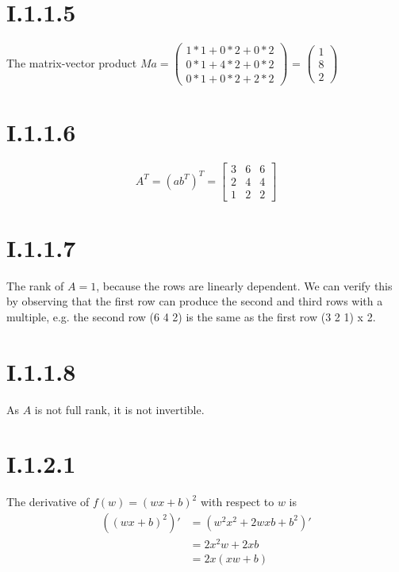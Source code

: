 \section*{I.1.1.5}
The matrix-vector product $Ma = \begin{pmatrix}
                                 1*1 + 0*2 + 0*2 \\
                                 0*1 + 4*2 + 0*2 \\
                                 0*1 + 0*2 + 2*2
                                \end{pmatrix}$
                              = $\begin{pmatrix}
                                 1 \\
                                 8 \\
                                 2
                                \end{pmatrix}$

\section*{I.1.1.6}
\[
	A^T = (ab^T)^T = \begin{bmatrix}
		          3 & 6 & 6 \\
		          2 & 4 & 4 \\
		          1 & 2 & 2
	                 \end{bmatrix}
\]

\section*{I.1.1.7}
The rank of $A = 1$, because the rows are linearly dependent. We can verify this
by observing that the first row can produce the second and third rows with a
multiple, e.g. the second row (6 4 2) is the same as the first row (3 2 1) x 2.

\section*{I.1.1.8}
As $A$ is not full rank, it is not invertible.

\section*{I.1.2.1}
The derivative of $f(w) = (wx + b)^2$ with respect to $w$ is
\begin{align*}
	((wx+b)^2)' &= (w^2 x^2 + 2wxb+b^2)' \\
	&= 2x^2w + 2xb \\
	&= 2x(xw + b)
\end{align*}

